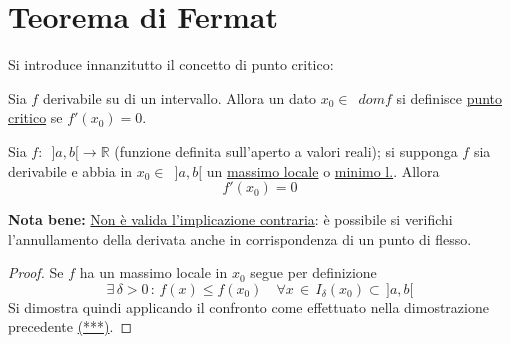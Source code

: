 \documentclass[10pt, oneside]{book}
\theoremstyle{plain}
\begin{document}
\section{Teorema di Fermat}
Si introduce innanzitutto il concetto di punto critico:
\begin{defin}
\label{critico}
Sia $f$ derivabile su di un intervallo. Allora un dato $x_0 \in \enspace dom f$ si definisce \underline{punto critico} se $f'(x_0) = 0$.
\end{defin}

\begin{ther}
Sia $f: \enspace ]a, b[ \rightarrow \mathbb{R}$ (funzione definita sull'aperto a valori reali); si supponga $f$ sia derivabile e abbia in $x_0 \in \enspace ]a, b[$ un \underline{massimo locale} o \underline{minimo l.}. Allora \[f'(x_0) = 0\]
\end{ther}
\textbf{Nota bene:} \underline{Non è valida l'implicazione contraria}: è possibile si verifichi l'annullamento della derivata anche in corrispondenza di un punto di flesso.
\begin{proof}
Se $f$ ha un massimo locale in $x_0$ segue per definizione
\[\exists \, \delta > 0 \, : \, f(x) \leq f(x_0) \quad \forall x \, \in \, I_\delta (x_0) \subset \, ]a,b[ \]
Si dimostra quindi applicando il confronto come effettuato nella dimostrazione precedente \hyperlink{confr}{(***)}.
\end{proof}
\end{document}
